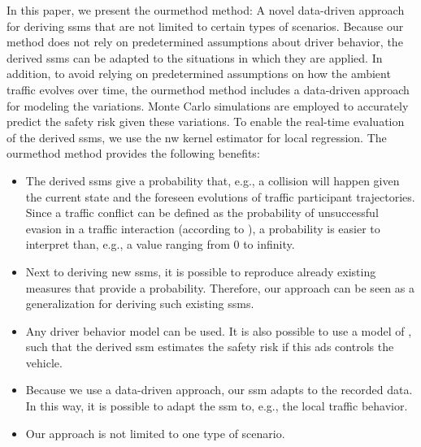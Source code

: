 \cstarta In this paper, we present the \ac{ourmethod} method: A novel data-driven approach for deriving \acp{ssm} that are not limited to certain types of scenarios.
Because our method does not rely on predetermined \cenda\cstartb assumptions about driver behavior\cendb\cstarta, the derived \acp{ssm} can be adapted to the situations in which they are applied. 
In addition, to avoid relying on predetermined assumptions on how the ambient traffic evolves over time, the \ac{ourmethod} method includes a data-driven approach for modeling the variations. 
Monte Carlo simulations are employed to accurately predict the safety risk given these variations.
To enable the real-time evaluation of the derived \acp{ssm}, we use the \ac{nw} kernel estimator \autocite{wasserman2006nonparametric} for local regression.
The \ac{ourmethod} method provides the following benefits: \cenda
\begin{itemize}
	\item The derived \acp{ssm} give a probability that, e.g., a collision will happen \cstartc given the current state and the foreseen evolutions of traffic participant trajectories. 
	\cstartb Since a traffic conflict can be defined as the probability of unsuccessful evasion in a traffic interaction (according to \textcite{davis2011outline}), a probability is easier to interpret than, e.g., a value ranging from 0 to infinity. \cendb
	
	\item \cstarta Next to deriving new \acp{ssm}, \cenda it is possible to reproduce already existing measures that provide a probability. 
	Therefore, our approach can be seen as a generalization for deriving such existing \acp{ssm}.
	
	\item Any driver behavior model can be used.
	It is also possible to use a model of , such that the derived \ac{ssm} estimates the safety risk if this \ac{ads} controls the vehicle.
	
	\item Because we use a data-driven approach, our \ac{ssm} adapts to the recorded data. 
	In this way, it is possible to \cstarta adapt the \ac{ssm} to, e.g., the local traffic behavior\cenda.
	
	\item Our approach \cstartc is not limited to one type of scenario. \cendc
\end{itemize}

